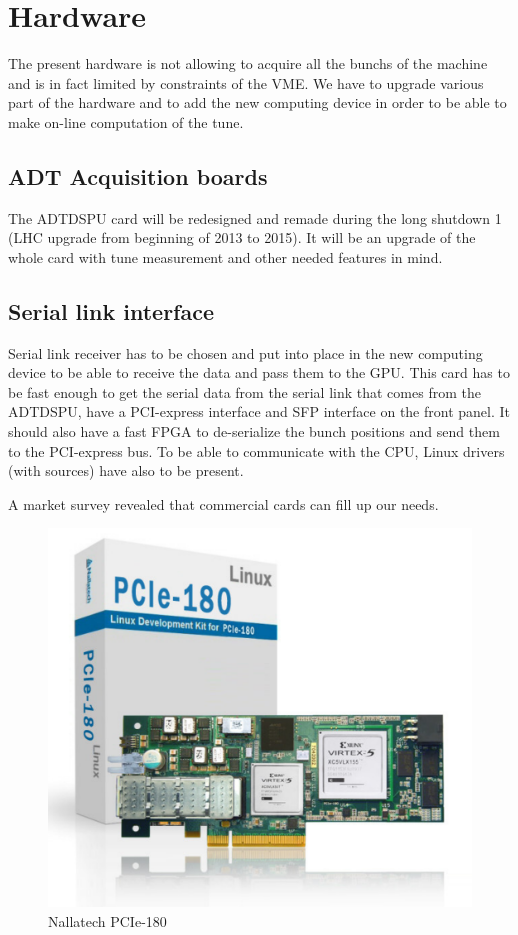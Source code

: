 \section{Hardware}

The present hardware is not allowing to acquire all the \glspl{bunch} of the machine and is in fact limited by constraints of the \gls{VME}. We have to upgrade various part of the hardware and to add the new computing device in order to be able to make on-line computation of the tune.

	\subsection{ADT Acquisition boards}

	The ADTDSPU card will be redesigned and remade during the long shutdown 1 (LHC upgrade from beginning of 2013 to 2015). It will be an upgrade of the whole card with tune measurement and other needed features in mind.

	\subsection{Serial link interface}

	Serial link receiver has to be chosen and put into place in the new computing device to be able to receive the data and pass them to the \gls{GPU}. This card has to be fast enough to get the serial data from the serial link that comes from the ADTDSPU, have a PCI-express interface and \gls{SFP} interface on the front panel. It should also have a fast FPGA to de-serialize the bunch positions and send them to the PCI-express bus. To be able to communicate with the CPU, Linux drivers (with sources) have also to be present.

	A market survey revealed that commercial cards can fill up our needs.

	\begin{figure}[H]
	\caption{Nallatech PCIe-180}
	\label{fig:nallatech}
	\centering
	\includegraphics[scale=0.3]{Nallatech_PCIe-180.pdf}
	\end{figure}

